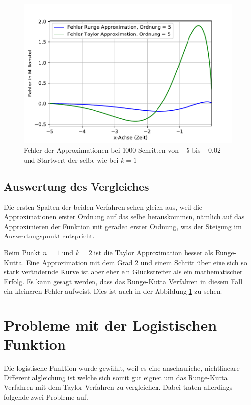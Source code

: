 \begin{figure}
	\centering
	\includegraphics[width=12cm]{papers/taylor/taylorPictures/FehlerRungeUndTaylor.pdf}
	\caption{Fehler der Approximationen bei 1000 Schritten von $-5$ bis $-0.02$ und Startwert der selbe wie bei $k=1$}
	\label{taylor:section:fig:FehlerRungeTaylor}
\end{figure}

\subsection{Auswertung des Vergleiches}
\label{taylor:subsection:Auswertung}
Die ersten Spalten der beiden Verfahren sehen gleich aus, weil die Approximationen erster Ordnung auf das selbe herauskommen, nämlich auf das Approximieren der Funktion mit geraden erster Ordnung, was der Steigung im Auswertungspunkt entspricht.

Beim Punkt $n=1$ und $k=2$ ist die Taylor Approximation besser als Runge-Kutta.
Eine Approximation mit dem Grad 2 und einem Schritt über eine sich so stark verändernde Kurve ist aber eher ein Glückstreffer als ein mathematischer Erfolg.
Es kann gesagt werden, dass das Runge-Kutta Verfahren in diesem Fall ein kleineren Fehler aufweist. Dies ist auch in der Abbildung \ref{taylor:section:fig:FehlerRungeTaylor} zu sehen.

\section{Probleme mit der Logistischen Funktion}
\label{taylor:subsection:Probleme}
Die logistische Funktion wurde gewählt, weil es eine anschauliche, nichtlineare Differentialgleichung ist welche sich somit gut eignet um das Runge-Kutta Verfahren mit dem Taylor Verfahren zu vergleichen.
Dabei traten allerdings folgende zwei Probleme auf.


